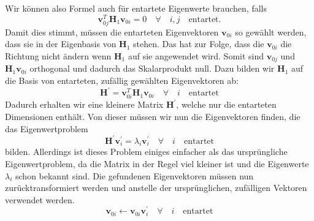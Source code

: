 Wir können also Formel  auch für entartete Eigenwerte brauchen, falls
\begin{equation}
    \bm v_{0j}^T \bm H_1 \bm v_{0i} = 0 \quad \forall \quad i,j \quad \text{entartet}. \label{ew:eq:condition-degenerated}
\end{equation}
Damit dies stimmt, müssen die entarteten Eigenvektoren $\bm v_{0i}$ so gewählt werden, dass sie in der Eigenbasis von $\bm H_1$ stehen. %
Das hat zur Folge, dass die  $\bm v_{0i}$ die Richtung nicht ändern wenn $\bm H_1$ auf sie angewendet wird.
Somit sind $\bm v_{0j}$ und $\bm H_1 \bm v_{0i}$ orthogonal und dadurch das Skalarprodukt null.
Dazu bilden wir $\bm H_1$ auf die Basis von entarteten, zufällig gewählten Eigenvektoren ab:
\begin{equation}
    \bm H^\prime = \bm v_{0i}^T \bm H_1 \bm v_{0i} \quad \forall \quad i \quad \text{entartet}
\end{equation}
Dadurch erhalten wir eine kleinere Matrix $\bm H^\prime$, welche nur die entarteten Dimensionen enthält.
Von dieser müssen wir nun die Eigenvektoren finden, die das Eigenwertproblem
\begin{equation}
    \bm H^\prime \bm v_{i}^\prime = \lambda_{i} \bm v_i^\prime \quad \forall \quad i \quad \text{entartet}
\end{equation}
bilden.
Allerdings ist dieses Problem einiges einfacher als das ursprüngliche Eigenwertproblem, da die Matrix in der Regel viel kleiner ist und die Eigenwerte $\lambda_i$ schon bekannt sind.
Die gefundenen Eigenvektoren müssen nun zurücktransformiert werden und anstelle der ursprünglichen, zufälligen Vektoren verwendet werden.
\begin{equation}
    \bm v_{0i} \gets \bm v_{0i} \bm v_{i}^\prime \quad \forall \quad i \quad \text{entartet}
\end{equation}

